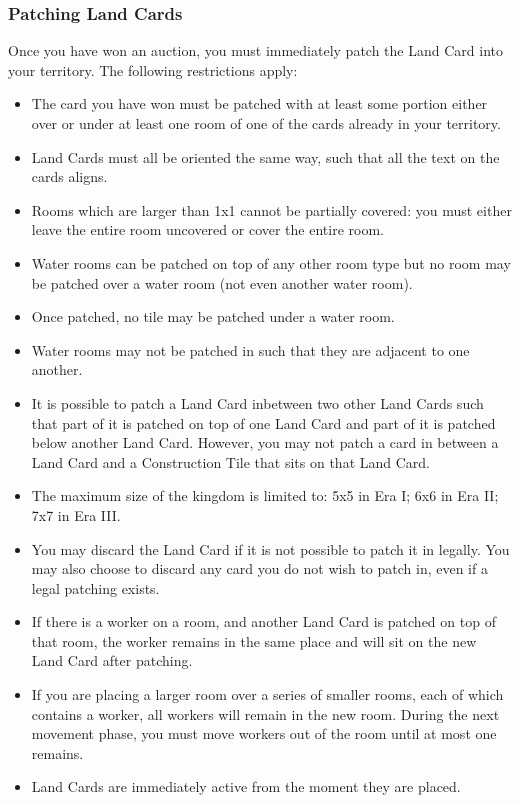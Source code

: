 \documentclass[10pt,twocolumn]{article}
\begin{document}
\subsubsection{Patching Land Cards}
Once you have won an auction, you must immediately patch the Land Card into your territory. The following restrictions apply:
\begin{itemize}
\item The card you have won must be patched with at least some portion either over or under at least one room of one of the cards already in your territory.
\item Land Cards must all be oriented the same way, such that all the text on the cards aligns.
\item Rooms which are larger than 1x1 cannot be partially covered: you must either leave the entire room uncovered or cover the entire room.
\end{itemize}
\begin{itemize}
\item Water rooms can be patched on top of any other room type but no room may be patched over a water room (not even another water room).
\end{itemize}
\begin{itemize}
\item Once patched, no tile may be patched under a water room.
\item Water rooms may not be patched in such that they are adjacent to one another.
\item It is possible to patch a Land Card inbetween two other Land Cards such that part of it is patched on top of one Land Card and part of it is patched below another Land Card. However, you may not patch a card in between a Land Card and a Construction Tile that sits on that Land Card.
\end{itemize}
\begin{itemize}
\item The maximum size of the kingdom is limited to: 5x5 in Era I; 6x6 in Era II; 7x7 in Era III.
\end{itemize}
\begin{itemize}
\item You may discard the Land Card if it is not possible to patch it in legally. You may also choose to discard any card you do not wish to patch in, even if a legal patching exists.
\item If there is a worker on a room, and another Land Card is patched on top of that room, the worker remains in the same place and will sit on the new Land Card after patching.
\item If you are placing a larger room over a series of smaller rooms, each of which contains a worker, all workers will remain in the new room. During the next movement phase, you must move workers out of the room until at most one remains.
\item Land Cards are immediately active from the moment they are placed.
\end{itemize}
\end{document}
